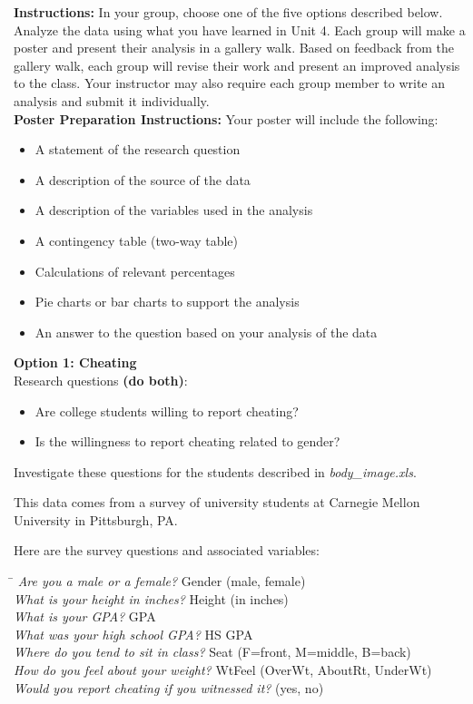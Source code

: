 \textbf{Instructions:} In your group, choose one of the five options described below. Analyze the data using what you have learned in Unit 4. Each group will make a poster and present their analysis in a gallery walk. Based on feedback from the gallery walk, each group will revise their work and present an improved analysis to the class. Your instructor may also require each group member to write an analysis and submit it individually.\\ 


\textbf{Poster Preparation Instructions:} Your poster will include the following: 
\begin{itemize}
\item A statement of the research question 
\item A description of the source of the data 
\item A description of the variables used in the analysis 
\item A contingency table (two-way table)
\item Calculations of relevant percentages
\item Pie charts or bar charts to support the analysis
\item An answer to the question based on your analysis of the data
\end{itemize}

\textbf{Option 1: Cheating}\\
Research questions \textbf{(do both)}:
\begin{itemize}
\item Are college students willing to report cheating?
\item Is the willingness to report cheating related to gender?
\end{itemize}

Investigate these questions for the students described in \emph{body\_image.xls}. 

This data comes from a survey of university students at Carnegie Mellon University in Pittsburgh, PA.

Here are the survey questions and associated variables: 
\begin{tabbing}
\hspace*{3in}\=\kill
\emph{Are you a male or a female?}\> Gender (male, female)\\
\emph{What is your height in inches?}\> Height (in inches)\\
\emph{What is your GPA?}\> GPA\\
\emph{What was your high school GPA?}\> HS GPA\\
\emph{Where do you tend to sit in class?}\> Seat (F=front, M=middle, B=back)\\
\emph{How do you feel about your weight?}\> WtFeel (OverWt, AboutRt, UnderWt)\\
\emph{Would you report cheating if you witnessed it?}\> (yes, no)
\end{tabbing}

